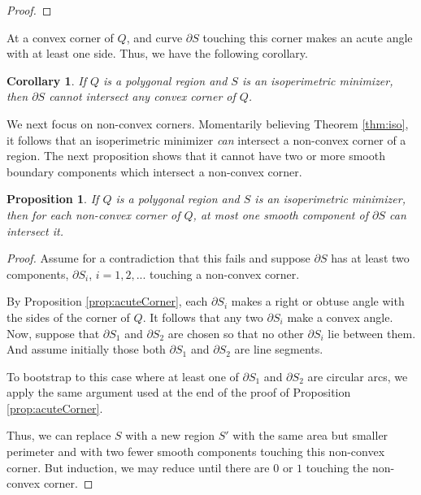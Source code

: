 \documentclass[leqno]{article}
\numberwithin{equation}{section}
\theoremstyle{definition}
\theoremstyle{remark}
\theoremstyle{plain}
\newtheorem{corollary}[equation]{Corollary}
\newtheorem{proposition}[equation]{Proposition}
\begin{document}
\begin{proof}
   
\end{proof}

{\color{blue}
At a convex corner of $Q$, and curve $\partial S$ touching this corner makes an acute angle with at least one side.  Thus, we have the following corollary.

\begin{corollary}If $Q$ is a polygonal region and $S$ is an isoperimetric minimizer, then $\partial S$ cannot intersect any convex corner of $Q$.
\end{corollary}

We next focus on non-convex corners.  Momentarily believing Theorem \ref{thm:iso}, it follows that an isoperimetric minimizer \textit{can} intersect a non-convex corner of a region.  The next proposition shows that it cannot have two or more smooth boundary components which intersect a non-convex corner.

\begin{proposition} If $Q$ is a polygonal region and $S$ is an isoperimetric minimizer, then for each non-convex corner of $Q$, at most one smooth component of $\partial S$ can intersect it.

\end{proposition}

\begin{proof}
Assume for a contradiction that this fails and suppose $\partial S$ has at least two components, $\partial S_i$, $i=1,2,...$ touching a non-convex corner.

By Proposition \ref{prop:acuteCorner}, each $\partial S_i$ makes a right or obtuse angle with the sides of the corner of $Q$.  It follows that any two $\partial S_i$ make a convex angle.  Now, suppose that $\partial S_1$ and $\partial S_2$ are chosen so that no other $\partial S_i$ lie between them.  And assume initially those both $\partial S_1$ and $\partial S_2$ are line segments.


To bootstrap to this case where at least one of $\partial S_1$ and $\partial S_2$ are circular arcs, we apply the same argument used at the end of the proof of Proposition \ref{prop:acuteCorner}.

Thus, we can replace $S$ with a new region $S'$ with the same area but smaller perimeter and with two fewer smooth components touching this non-convex corner.  But induction, we may reduce until there are $0$ or $1$ touching the non-convex corner.
\end{proof}

}
\end{document}
